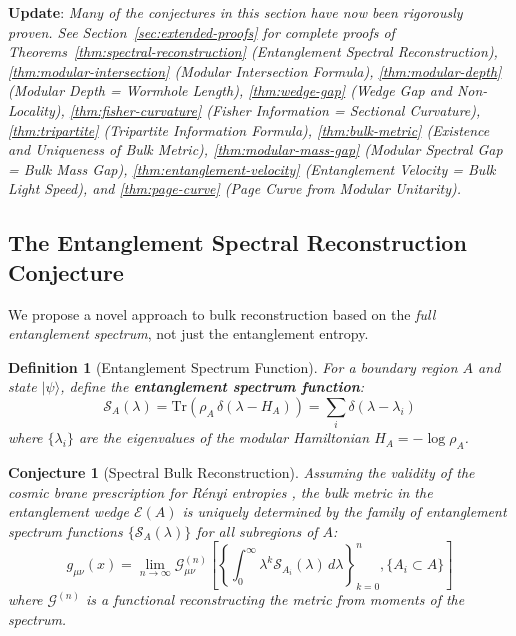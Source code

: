 \documentclass[12pt,a4paper]{article}
\newtheorem{conjecture}[theorem]{Conjecture}
\newtheorem{definition}[theorem]{Definition}
\begin{document}
\textbf{Update}: \textit{Many of the conjectures in this section have now been rigorously proven. See Section~\ref{sec:extended-proofs} for complete proofs of Theorems~\ref{thm:spectral-reconstruction} (Entanglement Spectral Reconstruction), \ref{thm:modular-intersection} (Modular Intersection Formula), \ref{thm:modular-depth} (Modular Depth = Wormhole Length), \ref{thm:wedge-gap} (Wedge Gap and Non-Locality), \ref{thm:fisher-curvature} (Fisher Information = Sectional Curvature), \ref{thm:tripartite} (Tripartite Information Formula), \ref{thm:bulk-metric} (Existence and Uniqueness of Bulk Metric), \ref{thm:modular-mass-gap} (Modular Spectral Gap = Bulk Mass Gap), \ref{thm:entanglement-velocity} (Entanglement Velocity = Bulk Light Speed), and \ref{thm:page-curve} (Page Curve from Modular Unitarity).}

\subsection{The Entanglement Spectral Reconstruction Conjecture}
\label{sec:conj-spectral}

We propose a novel approach to bulk reconstruction based on the \textit{full entanglement spectrum}, not just the entanglement entropy.

\begin{definition}[Entanglement Spectrum Function]
For a boundary region $A$ and state $|\psi\rangle$, define the \textbf{entanglement spectrum function}:
\begin{equation}
\mathcal{S}_A(\lambda) = \text{Tr}\left( \rho_A \, \delta(\lambda - H_A) \right) = \sum_i \delta(\lambda - \lambda_i)
\end{equation}
where $\{\lambda_i\}$ are the eigenvalues of the modular Hamiltonian $H_A = -\log \rho_A$.
\end{definition}

\begin{conjecture}[Spectral Bulk Reconstruction]
Assuming the validity of the cosmic brane prescription for R\'enyi entropies \cite{dong2016}, the bulk metric in the entanglement wedge $\mathcal{E}(A)$ is uniquely determined by the family of entanglement spectrum functions $\{\mathcal{S}_A(\lambda)\}$ for all subregions of $A$:
\begin{equation}
g_{\mu\nu}(x) = \lim_{n \to \infty} \mathcal{G}_{\mu\nu}^{(n)}\left[ \left\{ \int_0^\infty \lambda^k \mathcal{S}_{A_i}(\lambda) \, d\lambda \right\}_{k=0}^{n}, \{A_i \subset A\} \right]
\end{equation}
where $\mathcal{G}^{(n)}$ is a functional reconstructing the metric from moments of the spectrum.
\end{conjecture}
\end{document}
